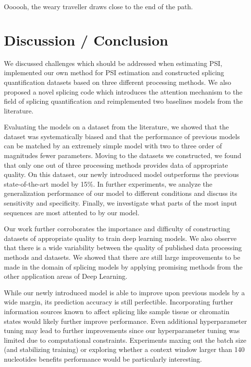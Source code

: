 \begin{savequote}[8cm]
	
	Oooooh, the weary traveller draws close to the end of the path.
\end{savequote}

\chapter{\label{ch:6-conclusion}Discussion / Conclusion} %


We discussed challenges which should be addressed when estimating PSI, implemented our own method for PSI estimation and constructed splicing quantification datasets based on three different processing methods. We also proposed a novel splicing code which introduces the attention mechanism to the field of splicing quantification and reimplemented two baselines models from the literature.

Evaluating the models on a dataset from the literature, we showed that the dataset was systematically biased and that the performance of previous models can be matched by an extremely simple model with two to three order of magnitudes fewer parameters. 
Moving to the datasets we constructed, we found that only one out of three processing methods provides data of appropriate quality. On this dataset, our newly introduced model outperforms the previous state-of-the-art model by 15\%. In further experiments, we analyze the generalization performance of our model to different conditions and discuss its sensitivity and specificity. Finally, we investigate what parts of the most input sequences are most attented to by our model.

Our work further corroborates the importance and difficulty of constructing datasets of appropriate quality to train deep learning models. We also observe that there is a wide variability between the quality of published data processing methods and datasets. We showed that there are still large improvements to be made in the domain of splicing models by applying promising methods from the other application areas of Deep Learning. %

While our newly introduced model is able to improve upon previous models by a wide margin, its prediction accuracy is still perfectible. Incorporating further information sources known to affect splicing like sample tissue or chromatin states \cite{chromatin} would likely further improve performance. 
Even additional hyperparameter tuning may lead to further improvements since our hyperparameter tuning was limited due to computational constraints. Experiments maxing out the batch size (and stabilizing training) or exploring whether a context window larger than 140 nucleotides benefits performance would be particularly interesting. 

